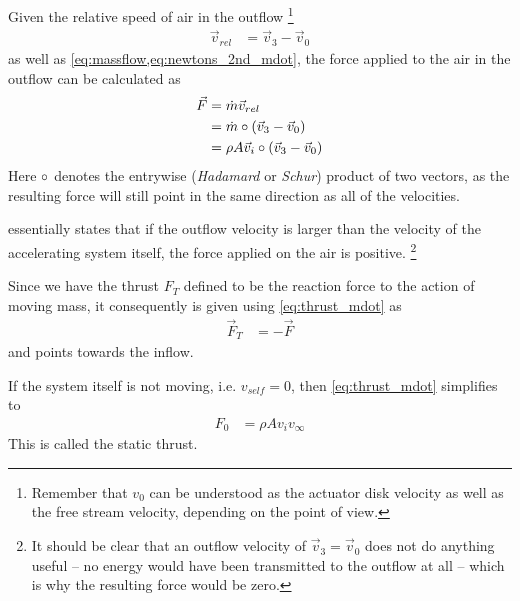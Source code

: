 Given the relative speed of air in the outflow%
\footnote{Remember that $v_0$ can be understood as the actuator disk velocity as well as the free stream velocity, depending on the point of view.} 
%
\begin{align}
\vec{v}_{rel} &= \vec{v}_3 - \vec{v}_0
\end{align}
%
as well as \cref{eq:massflow,eq:newtons_2nd_mdot}, the force applied to the air in the outflow can be calculated \cite{durand1935} as
%
\begin{align}
\vec{F} &= \dot{m} \vec{v}_{rel} \notag \\
		&= \dot{m} \circ \left( \vec{v}_3 - \vec{v}_0 \right) \\
		&= \rho A \vec{v}_i \circ \left( \vec{v}_3 - \vec{v}_0 \right) \label{eq:thrust_mdot}
\end{align}
%
Here $\circ$ denotes the entrywise (\textit{Hadamard} or \textit{Schur}) product of two vectors, as the resulting force will still point in the same direction as all of the velocities.

 essentially states that if the outflow velocity is larger than the velocity
of the accelerating system itself, the force applied on the air is positive.%
\footnote{It should be clear that an outflow velocity of $\vec{v}_3 = \vec{v}_0$ does not do anything useful -- no energy would have been transmitted to the outflow at all -- 
which is why the resulting force would be zero.}


Since we have the thrust $F_T$ defined to be the reaction force to the action of moving mass, it consequently is given using \cref{eq:thrust_mdot} as
%
\begin{align}
\vec{F}_T &= -\vec{F} \label{eq:thrust}
\end{align}
%
and points towards the inflow.

If the system itself is not moving, i.e. $v_{self} = 0$, then \cref{eq:thrust_mdot} simplifies to
%
\begin{align}
F_{0} &= \rho A v_i v_\infty \label{eq:static_thrust_Av}
\end{align}
%
This is called the static thrust. %


